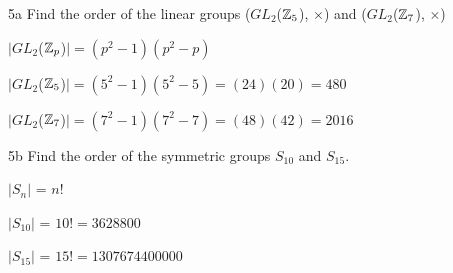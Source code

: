 \begin{question}{5a}
Find the order of the linear groups ($GL_2$($\mathbb{Z}_5$), $\times$) and ($GL_2$($\mathbb{Z}_7$), $\times$)

$|GL_2$($\mathbb{Z}_p$)$| = (p^2-1)(p^2-p)$

$|GL_2$($\mathbb{Z}_5$)$| = (5^2-1)(5^2-5) = (24)(20) = 480$

$|GL_2$($\mathbb{Z}_7$)$| = (7^2-1)(7^2-7) = (48)(42) = 2016$

\end{question}

\begin{question}{5b}
Find the order of the symmetric groups $S_{10}$ and $S_{15}$.

$|S_n|$ = $n!$

$|S_{10}|$ = $10! = 3628800$

$|S_{15}|$ = $15! = 1307674400000$

\end{question}


